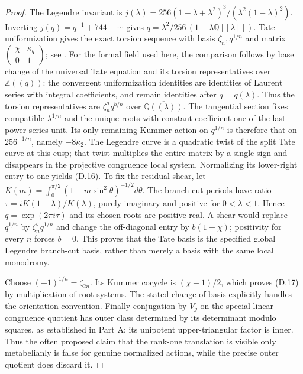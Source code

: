 \begin{proof}
The Legendre invariant is
$j(\lambda)=256(1-\lambda+\lambda^2)^3/(\lambda^2(1-\lambda)^2)$.
Inverting $j(q)=q^{-1}+744+\cdots$ gives
$q=\lambda^2/256\,(1+\lambda\mathbb Q[[\lambda]])$.
Tate uniformization gives the exact torsion sequence with basis $\zeta_n,q^{1/n}$ and matrix $\left(\begin{smallmatrix}\chi&\kappa_q\\0&1\end{smallmatrix}\right)$; see \cite[\S11, Theorem11.17 and the preceding uniformization]{dJoshiTate}. For the formal field used here, the comparison follows by base change of the universal Tate equation and its torsion representatives over $\mathbb Z((q))$: the convergent uniformization identities are identities of Laurent series with integral coefficients, and remain identities after $q=q(\lambda)$. Thus the torsion representatives are $\zeta_n^a q^{b/n}$ over $\overline{\mathbb Q((\lambda))}$. The tangential section fixes compatible $\lambda^{1/n}$ and the unique roots with constant coefficient one of the last power-series unit. Its only remaining Kummer action on $q^{1/n}$ is therefore that on $256^{-1/n}$, namely $-8\kappa_2$. The Legendre curve is a quadratic twist of the split Tate curve at this cusp; that twist multiplies the entire matrix by a single sign and disappears in the projective congruence local system. Normalizing its lower-right entry to one yields (D.16). To fix the residual shear, let $K(m)=\int_0^{\pi/2}(1-m\sin^2\theta)^{-1/2}d\theta$. The branch-cut periods have ratio $\tau=iK(1-\lambda)/K(\lambda)$, purely imaginary and positive for $0<\lambda<1$. Hence $q=\exp(2\pi i\tau)$ and its chosen roots are positive real. A shear would replace $q^{1/n}$ by $\zeta_n^b q^{1/n}$ and change the off-diagonal entry by $b(1-\chi)$; positivity for every $n$ forces $b=0$. This proves that the Tate basis is the specified global Legendre branch-cut basis, rather than merely a basis with the same local monodromy.

Choose $(-1)^{1/n}=\zeta_{2n}$. Its Kummer cocycle is $(\chi-1)/2$, which proves (D.17) by multiplication of root systems. The stated change of basis explicitly handles the orientation convention. Finally conjugation by $V_g$ on the special linear congruence quotient has outer class determined by its determinant modulo squares, as established in Part A; its unipotent upper-triangular factor is inner. Thus the often proposed claim that the rank-one translation is visible only metabelianly is false for genuine normalized actions, while the precise outer quotient does discard it.
\end{proof}

